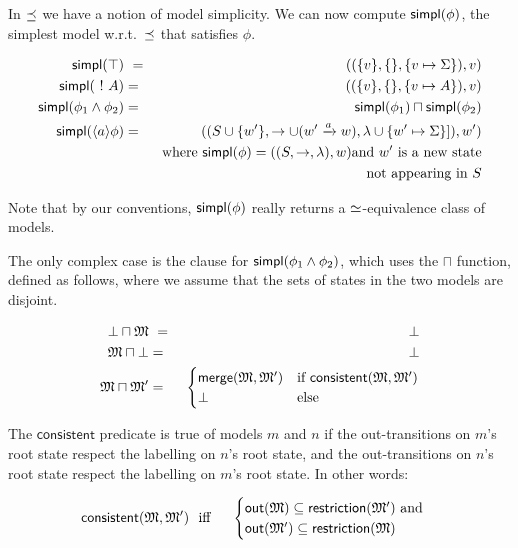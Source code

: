 \NI In $\preceq $ we have a notion of model simplicity.  We can now
compute $\mathsf{simpl}(\phi)$, the simplest model w.r.t.~$\preceq $ that
satisfies $\phi$.

\begin{eqnarray*}
  \mathsf{simpl}(\top) &\ = \ & ( (\{v\}, \{\}, \{v \mapsto \Sigma\}), v)  \\
  \mathsf{simpl}(\ ! \  A) & = & ( (\{v\}, \{\}, \{v \mapsto A\}), v)  \\
  \mathsf{simpl}(\phi_1 \land \phi_2) & = & \mathsf{simpl}(\phi_1) \sqcap \mathsf{simpl}(\phi_2)  \\
  \mathsf{simpl}(\langle a \rangle \phi) 
     & = & ( (S \cup \{w'\}, \rightarrow \cup (w' \xrightarrow{a} w), \lambda \cup \{w' \mapsto \Sigma\}]), w')  \\
		& & \mbox{where }\mathsf{simpl}(\phi) = ( (S, \rightarrow, \lambda), w) \mbox{and } w' \mbox{ is a new state} \\
                &&  \mbox{not appearing in }S 
\end{eqnarray*}





\NI Note that by our conventions, $\mathsf{simpl}(\phi)$ really returns a
$\simeq$-equivalence class of models.

The only complex case is the clause for $\mathsf{simpl}(\phi_1 \land \phi_2)$,
which uses the $\sqcap$ function, defined as follows, where we assume
that the sets of states in the two models are disjoint.

\begin{eqnarray*}
  \bot \sqcap \MMM  &\ =\ &  \bot  \\
  \MMM \sqcap \bot      & = &  \bot  
     \\
  \MMM \sqcap \MMM'
     & = & 
  \begin{cases}
    \mathsf{merge}(\MMM, \MMM') & \text{if}\ \mathsf{consistent}(\MMM, \MMM') \\
    \bot & \text{else}
  \end{cases}
\end{eqnarray*}

\NI The $\mathsf{consistent}$ predicate is true of models $m$ and $n$ if
the out-transitions on $m$'s root state respect the labelling on $n$'s
root state, and the out-transitions on $n$'s root state respect the
labelling on $m$'s root state. In other words:

\begin{eqnarray*}
  \mathsf{consistent}(\frak{M}, \frak{M}') 
     &\ \mbox{ iff }\ & 
  \begin{cases}
    \mathsf{out}(\frak{M}) \subseteq \mathsf{restriction}(\frak{M}') \mbox{ and}  \\
    \mathsf{out}(\frak{M}') \subseteq \mathsf{restriction}(\frak{M}) 
  \end{cases}
\end{eqnarray*}

